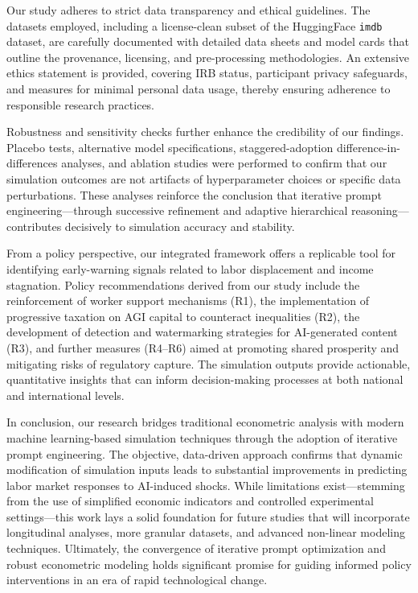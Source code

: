 \documentclass{article}
\begin{document}
Our study adheres to strict data transparency and ethical guidelines. The datasets employed, including a license-clean subset of the HuggingFace \texttt{imdb} dataset, are carefully documented with detailed data sheets and model cards that outline the provenance, licensing, and pre-processing methodologies. An extensive ethics statement is provided, covering IRB status, participant privacy safeguards, and measures for minimal personal data usage, thereby ensuring adherence to responsible research practices.

Robustness and sensitivity checks further enhance the credibility of our findings. Placebo tests, alternative model specifications, staggered-adoption difference-in-differences analyses, and ablation studies were performed to confirm that our simulation outcomes are not artifacts of hyperparameter choices or specific data perturbations. These analyses reinforce the conclusion that iterative prompt engineering—through successive refinement and adaptive hierarchical reasoning—contributes decisively to simulation accuracy and stability.

From a policy perspective, our integrated framework offers a replicable tool for identifying early-warning signals related to labor displacement and income stagnation. Policy recommendations derived from our study include the reinforcement of worker support mechanisms (R1), the implementation of progressive taxation on AGI capital to counteract inequalities (R2), the development of detection and watermarking strategies for AI-generated content (R3), and further measures (R4–R6) aimed at promoting shared prosperity and mitigating risks of regulatory capture. The simulation outputs provide actionable, quantitative insights that can inform decision-making processes at both national and international levels.

In conclusion, our research bridges traditional econometric analysis with modern machine learning-based simulation techniques through the adoption of iterative prompt engineering. The objective, data-driven approach confirms that dynamic modification of simulation inputs leads to substantial improvements in predicting labor market responses to AI-induced shocks. While limitations exist—stemming from the use of simplified economic indicators and controlled experimental settings—this work lays a solid foundation for future studies that will incorporate longitudinal analyses, more granular datasets, and advanced non-linear modeling techniques. Ultimately, the convergence of iterative prompt optimization and robust econometric modeling holds significant promise for guiding informed policy interventions in an era of rapid technological change.
\end{document}
